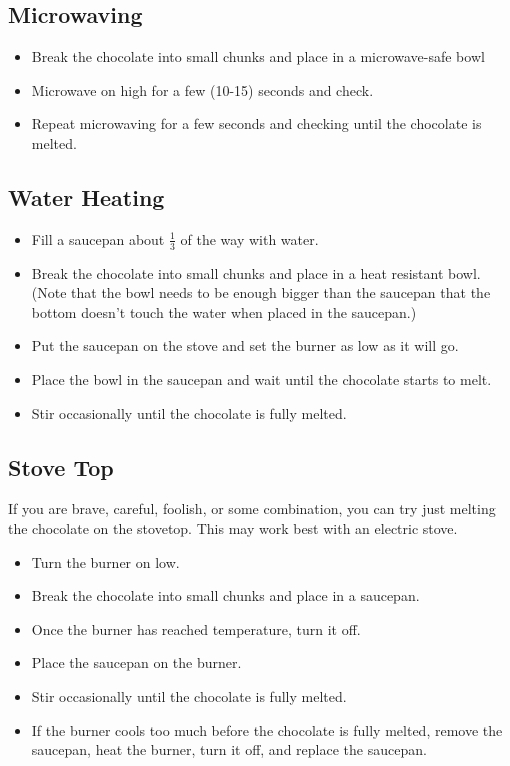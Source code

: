 \documentclass[10pt, openany]{book}
\begin{document}
\subsection{Microwaving}
\begin{itemize}
  \item Break the chocolate into small chunks and place in a microwave-safe bowl
  \item Microwave on high for a few (10-15) seconds and check.
  \item Repeat microwaving for a few seconds and checking until the chocolate is melted.
\end{itemize}
\subsection{Water Heating}
\begin{itemize}
  \item Fill a saucepan about $\frac{1}{3}$ of the way with water.
  \item Break the chocolate into small chunks and place in a heat resistant bowl.  (Note that the bowl needs to be enough bigger than the saucepan that the bottom doesn't touch the water when placed in the saucepan.)
  \item Put the saucepan on the stove and set the burner as low as it will go.
  \item Place the bowl in the saucepan and wait until the chocolate starts to melt.
  \item Stir occasionally until the chocolate is fully melted.
\end{itemize}
\subsection{Stove Top}
If you are brave, careful, foolish, or some combination, you can try just melting the chocolate on the stovetop.  This may work best with an electric stove.
\begin{itemize}
  \item Turn the burner on low.
  \item Break the chocolate into small chunks and place in a saucepan.
  \item Once the burner has reached temperature, turn it off.
  \item Place the saucepan on the burner.
  \item Stir occasionally until the chocolate is fully melted.
  \item If the burner cools too much before the chocolate is fully melted, remove the saucepan, heat the burner, turn it off, and replace the saucepan.
\end{itemize}
\end{document}
